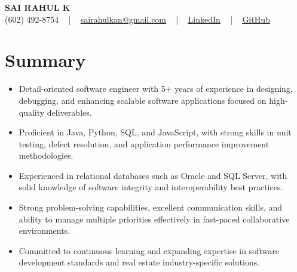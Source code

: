 \documentclass[letterpaper,11pt]{article}
\newcommand{\resumeItem}[1]{
  \item\footnotesize{
    {#1 \vspace{-2pt}}
  }
}
\newcommand{\resumeItemListStart}{\begin{itemize}[leftmargin=*]}
\newcommand{\resumeItemListEnd}{\end{itemize}\vspace{-5pt}}
\begin{document}
\begin{center}
    {\fontsize{14pt}{12pt}\selectfont \textbf{\MakeUppercase{Sai Rahul K}}}\\ \vspace{2pt}
    \fontsize{10pt}{12pt}\selectfont (602) 492-8754 ~ | ~ \href{mailto:sairahulkan@gmail.com}{sairahulkan@gmail.com} ~ | ~
    \href{https://www.linkedin.com/in/rq123/}{\color{blue}\underline{LinkedIn}} ~ | ~
    \href{https://github.com/kanrahuldo}{\color{blue}\underline{GitHub}}~
    \vspace{-8pt}
\end{center}

\section{Summary}
\fontsize{9pt}{10pt}\selectfont
\resumeItemListStart
    \resumeItem{Detail-oriented software engineer with 5+ years of experience in designing, debugging, and enhancing scalable software applications focused on high-quality deliverables.}
    \resumeItem{Proficient in Java, Python, SQL, and JavaScript, with strong skills in unit testing, defect resolution, and application performance improvement methodologies.}
    \resumeItem{Experienced in relational databases such as Oracle and SQL Server, with solid knowledge of software integrity and interoperability best practices.}
    \resumeItem{Strong problem-solving capabilities, excellent communication skills, and ability to manage multiple priorities effectively in fast-paced collaborative environments.}
    \resumeItem{Committed to continuous learning and expanding expertise in software development standards and real estate industry-specific solutions.}
\resumeItemListEnd
\vspace{-6pt}
\end{document}
